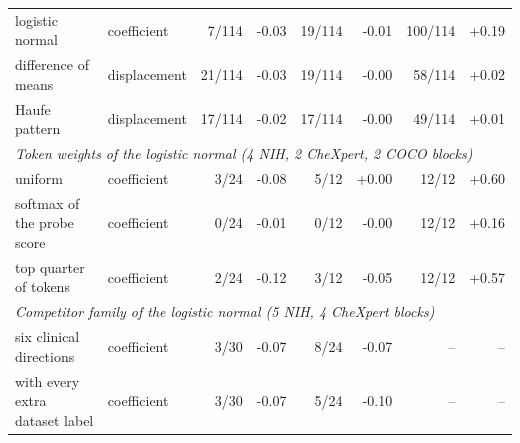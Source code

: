 \documentclass{article}
\begin{document}
\begin{table}[h]
{\begin{tabular}{llrrrrrr}
\quad logistic normal & coefficient & 7/114 & -0.03 & 19/114 & -0.01 & 100/114 & +0.19 \\
\quad difference of means & displacement & 21/114 & -0.03 & 19/114 & -0.00 & 58/114 & +0.02 \\
\quad Haufe pattern & displacement & 17/114 & -0.02 & 17/114 & -0.00 & 49/114 & +0.01 \\
\midrule
\multicolumn{8}{l}{\textit{Token weights of the logistic normal (4 NIH, 2 CheXpert, 2 COCO blocks)}} \\
\quad uniform & coefficient & 3/24 & -0.08 & 5/12 & +0.00 & 12/12 & +0.60 \\
\quad softmax of the probe score & coefficient & 0/24 & -0.01 & 0/12 & -0.00 & 12/12 & +0.16 \\
\quad top quarter of tokens & coefficient & 2/24 & -0.12 & 3/12 & -0.05 & 12/12 & +0.57 \\
\midrule
\multicolumn{8}{l}{\textit{Competitor family of the logistic normal (5 NIH, 4 CheXpert blocks)}} \\
\quad six clinical directions & coefficient & 3/30 & -0.07 & 8/24 & -0.07 & -- & -- \\
\quad with every extra dataset label & coefficient & 3/30 & -0.07 & 5/24 & -0.10 & -- & -- \\
\bottomrule
\end{tabular}}
\end{table}
\end{document}
